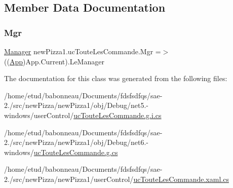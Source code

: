 \subsection{Member Data Documentation}
\mbox{\label{classnewPizza1_1_1ucTouteLesCommande_a838259c75d2541088575b748ba920fb4}} 
\subsubsection{\texorpdfstring{Mgr}{Mgr}}
{\footnotesize\ttfamily \hyperlink{classModele_1_1Manager}{Manager} new\+Pizza1.\+uc\+Toute\+Les\+Commande.\+Mgr =$>$ ((\hyperlink{classnewPizza1_1_1App}{App})App.\+Current).Le\+Manager}



The documentation for this class was generated from the following files\+:\begin{DoxyCompactItemize}
\item 
/home/etud/babonneau/\+Documents/fdsfsdfqs/sae-\/2./src/new\+Pizza/new\+Pizza1/obj/\+Debug/net5.-\/windows/user\+Control/\hyperlink{net5_80-windows_2userControl_2ucTouteLesCommande_8g_8i_8cs}{uc\+Toute\+Les\+Commande.\+g.\+i.\+cs}\item 
/home/etud/babonneau/\+Documents/fdsfsdfqs/sae-\/2./src/new\+Pizza/new\+Pizza1/obj/\+Debug/net6.-\/windows/\hyperlink{Debug_2net6_80-windows_2ucTouteLesCommande_8g_8cs}{uc\+Toute\+Les\+Commande.\+g.\+cs}\item 
/home/etud/babonneau/\+Documents/fdsfsdfqs/sae-\/2./src/new\+Pizza/new\+Pizza1/user\+Control/\hyperlink{ucTouteLesCommande_8xaml_8cs}{uc\+Toute\+Les\+Commande.\+xaml.\+cs}\end{DoxyCompactItemize}
